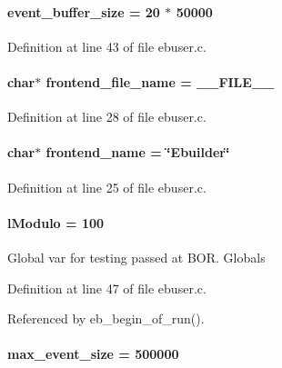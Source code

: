 \paragraph[{event\_\-buffer\_\-size}]{ {\bf event\_\-buffer\_\-size} = 20 $\ast$ 50000}\hfill\label{ebuser_8c_a4411d7db6f901c968b946ed659d202f6}


Definition at line 43 of file ebuser.c.
\paragraph[{frontend\_\-file\_\-name}]{\setlength{\rightskip}{0pt plus 5cm}char$\ast$ {\bf frontend\_\-file\_\-name} = \_\-\_\-FILE\_\-\_\-}\hfill\label{ebuser_8c_ac7fc683b5a25d9607abc270a54db6d97}


Definition at line 28 of file ebuser.c.
\paragraph[{frontend\_\-name}]{\setlength{\rightskip}{0pt plus 5cm}char$\ast$ {\bf frontend\_\-name} = \char`\"{}Ebuilder\char`\"{}}\hfill\label{ebuser_8c_ac1f0c6df66e35778b61c611107501ec4}


Definition at line 25 of file ebuser.c.
\paragraph[{lModulo}]{ {\bf lModulo} = 100}\hfill\label{ebuser_8c_a931a4ca265e2b03c9b59e773b628c1d2}


Global var for testing passed at BOR. Globals 

Definition at line 47 of file ebuser.c.

Referenced by eb\_\-begin\_\-of\_\-run().
\paragraph[{max\_\-event\_\-size}]{ {\bf max\_\-event\_\-size} = 500000}\hfill\label{ebuser_8c_a13adb6e6b95ca2a62bbfe2453d71a1cd}



